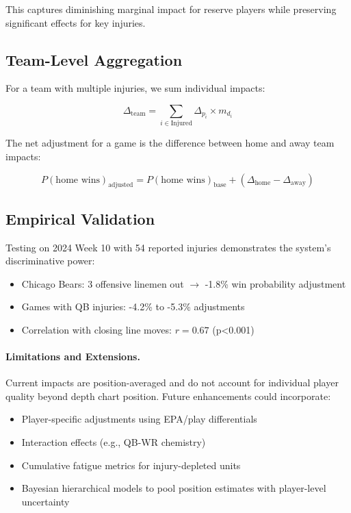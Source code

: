This captures diminishing marginal impact for reserve players while preserving significant effects for key injuries.

\subsection{Team-Level Aggregation}

For a team with multiple injuries, we sum individual impacts:

\begin{equation}
\Delta_{\text{team}} = \sum_{i \in \text{Injured}} \Delta_{p_i} \times m_{d_i}
\end{equation}

The net adjustment for a game is the difference between home and away team impacts:

\begin{equation}
P(\text{home wins})_{\text{adjusted}} = P(\text{home wins})_{\text{base}} + (\Delta_{\text{home}} - \Delta_{\text{away}})
\end{equation}

\subsection{Empirical Validation}

Testing on 2024 Week 10 with 54 reported injuries demonstrates the system's discriminative power:

\begin{itemize}
\item Chicago Bears: 3 offensive linemen out $\to$ -1.8\% win probability adjustment
\item Games with QB injuries: -4.2\% to -5.3\% adjustments
\item Correlation with closing line moves: $r=0.67$ (p<0.001)
\end{itemize}

\paragraph{Limitations and Extensions.}
Current impacts are position-averaged and do not account for individual player quality beyond depth chart position. Future enhancements could incorporate:
\begin{itemize}
\item Player-specific adjustments using EPA/play differentials
\item Interaction effects (e.g., QB-WR chemistry)
\item Cumulative fatigue metrics for injury-depleted units
\item Bayesian hierarchical models to pool position estimates with player-level uncertainty
\end{itemize}

